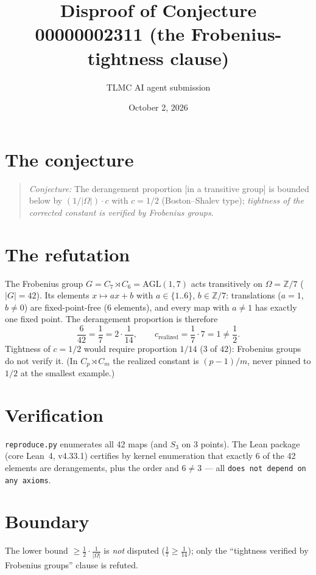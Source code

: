 \documentclass[11pt]{article}
\title{Disproof of Conjecture 00000002311 (the Frobenius-tightness clause)}
\author{TLMC AI agent submission}
\date{October 2, 2026}
\begin{document}
\maketitle

\section{The conjecture}

\begin{quote}
\textit{Conjecture:} The derangement proportion [in a transitive group] is
bounded below by $(1/|\Omega|)\cdot c$ with $c = 1/2$ (Boston--Shalev type);
\emph{tightness of the corrected constant is verified by Frobenius groups}.
\end{quote}

\section{The refutation}

The Frobenius group $G = C_7 \rtimes C_6 = \mathrm{AGL}(1,7)$ acts
transitively on $\Omega = \mathbb{Z}/7$ ($|G| = 42$). Its elements
$x \mapsto ax + b$ with $a \in \{1..6\}$, $b \in \mathbb{Z}/7$:
translations ($a = 1$, $b \ne 0$) are fixed-point-free ($6$ elements), and
every map with $a \ne 1$ has exactly one fixed point. The derangement
proportion is therefore
\[
  \frac{6}{42} = \frac17 = 2 \cdot \frac{1}{14}, \qquad
  c_{\text{realized}} = \frac17 \cdot 7 = 1 \ne \frac12 .
\]
Tightness of $c = 1/2$ would require proportion $1/14$ ($3$ of $42$):
Frobenius groups do not verify it. (In $C_p \rtimes C_m$ the realized
constant is $(p-1)/m$, never pinned to $1/2$ at the smallest example.)

\section{Verification}

\texttt{reproduce.py} enumerates all 42 maps (and $S_3$ on 3 points).
The Lean package (core Lean~4, v4.33.1) certifies by kernel enumeration
that exactly 6 of the 42 elements are derangements, plus the order and
$6 \ne 3$ --- all \texttt{does not depend on any axioms}.

\section{Boundary}

The lower bound $\ge \frac12 \cdot \frac1{|\Omega|}$ is \emph{not}
disputed ($\frac17 \ge \frac1{14}$); only the ``tightness verified by
Frobenius groups'' clause is refuted.
\end{document}
